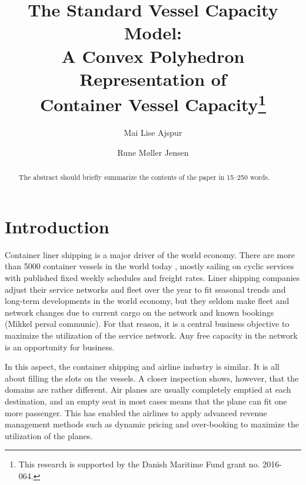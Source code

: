 \documentclass[runningheads]{llncs}
\begin{document}
%
\title{The Standard Vessel Capacity Model:\\ A Convex Polyhedron Representation of\\ Container Vessel Capacity\thanks{This research is supported by the Danish Maritime Fund grant no. 2016-064.}}
%
%
\author{Mai Lise Ajspur \and
Rune M{\o}ller Jensen}
%
%
%
\maketitle              %
%
\begin{abstract}
The abstract should briefly summarize the contents of the paper in
15--250 words.

\end{abstract}

\section{Introduction}
Container liner shipping is a major driver of the world economy\cite{TE13}. There are more than 5000 container vessels in the world today \cite{RMT16}, mostly sailing on cyclic services with published fixed weekly schedules and freight rates. Liner shipping companies adjust their service networks and fleet over the year to fit seasonal trends and long-term developments in the world economy, but they seldom make fleet and network changes due to current cargo on the network and known bookings (Mikkel persal communic). For that reason, it is a central business objective to maximize the utilization of the service network. Any free capacity in the network is an opportunity for business.

In this aspect, the container shipping and airline industry is similar. It is all about filling the slots on the vessels. A closer inspection shows, however, that the domains are rather different. Air planes are usually completely emptied at each destination, and an empty seat in most cases means that the plane can fit one more passenger. This has enabled the airlines to apply advanced revenue management methods such as dynamic pricing and over-booking to maximize the utilization of the planes.
\end{document}
